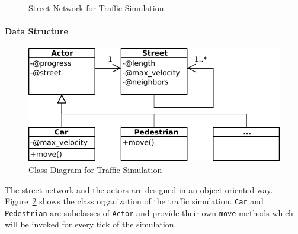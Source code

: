 \documentclass[preprint]{sigplanconf}
\begin{document}
\begin{figure}[!htp]
    \centering
    
    \caption{Street Network for Traffic Simulation}
    \label{fig:running_example}%
\end{figure}

\paragraph{Data Structure}
\begin{figure}[!htp]
    \centering
    \includegraphics[width=0.8\columnwidth]{class_diagram_running_ex.pdf}
    \caption{Class Diagram for Traffic Simulation}
    \label{fig:running_example_classes}
\end{figure}

The street network and the actors are designed in an object-oriented way. Figure~\ref{fig:running_example_classes} shows the class organization of the traffic simulation. \texttt{Car} and \texttt{Pedestrian} are subclasses of \texttt{Actor} and provide their own \texttt{move} methods which will be invoked for every tick of the simulation. 
\end{document}
